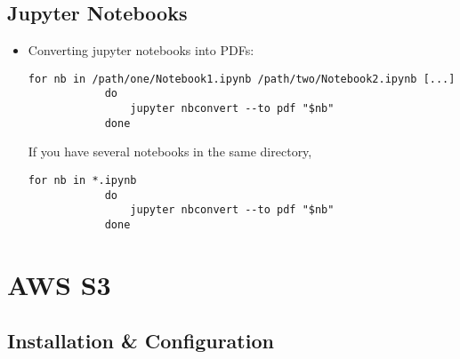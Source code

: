 \documentclass[12pt, a4paper]{article}
\numberwithin{equation}{section}
\theoremstyle{definition}
\theoremstyle{definition}
\begin{document}
	\subsection{Jupyter Notebooks}
	\begin{itemize}
		\item Converting jupyter notebooks into PDFs:
		
		\begin{lstlisting}[style=mystylepython, label=alg:notebooks_to_pdf, xleftmargin=\parindent]
			for nb in /path/one/Notebook1.ipynb /path/two/Notebook2.ipynb [...]
			do
				jupyter nbconvert --to pdf "$nb"
			done 
		\end{lstlisting}
	
		If you have several notebooks in the same directory, 
		\begin{lstlisting}[style=mystylepython, label=alg:notebooks_to_pdf__wildcard, xleftmargin=\parindent]
			for nb in *.ipynb
			do
				jupyter nbconvert --to pdf "$nb"
			done 
		\end{lstlisting}
		
	\end{itemize}

	\newpage 
	
	\section{AWS S3} 
	
	\subsection{Installation \& Configuration}
	
\end{document}
